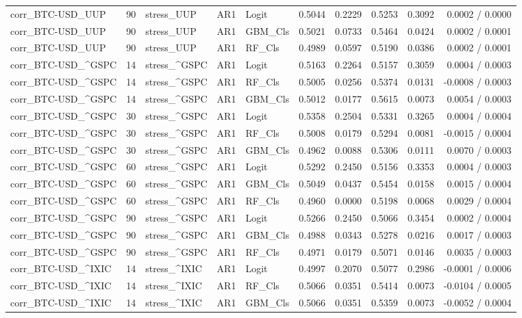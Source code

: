 \begin{table}[H]
\begin{tabular}{lllllrrrrr}
corr_BTC-USD_UUP & 90 & stress_UUP & AR1 & Logit & 0.5044 & 0.2229 & 0.5253 & 0.3092 & 0.0002 / 0.0000 \\
corr_BTC-USD_UUP & 90 & stress_UUP & AR1 & GBM_Cls & 0.5021 & 0.0733 & 0.5464 & 0.0424 & 0.0002 / 0.0001 \\
corr_BTC-USD_UUP & 90 & stress_UUP & AR1 & RF_Cls & 0.4989 & 0.0597 & 0.5190 & 0.0386 & 0.0002 / 0.0001 \\
corr_BTC-USD_^GSPC & 14 & stress_^GSPC & AR1 & Logit & 0.5163 & 0.2264 & 0.5157 & 0.3059 & 0.0004 / 0.0003 \\
corr_BTC-USD_^GSPC & 14 & stress_^GSPC & AR1 & RF_Cls & 0.5005 & 0.0256 & 0.5374 & 0.0131 & -0.0008 / 0.0003 \\
corr_BTC-USD_^GSPC & 14 & stress_^GSPC & AR1 & GBM_Cls & 0.5012 & 0.0177 & 0.5615 & 0.0073 & 0.0054 / 0.0003 \\
corr_BTC-USD_^GSPC & 30 & stress_^GSPC & AR1 & Logit & 0.5358 & 0.2504 & 0.5331 & 0.3265 & 0.0004 / 0.0004 \\
corr_BTC-USD_^GSPC & 30 & stress_^GSPC & AR1 & RF_Cls & 0.5008 & 0.0179 & 0.5294 & 0.0081 & -0.0015 / 0.0004 \\
corr_BTC-USD_^GSPC & 30 & stress_^GSPC & AR1 & GBM_Cls & 0.4962 & 0.0088 & 0.5306 & 0.0111 & 0.0070 / 0.0003 \\
corr_BTC-USD_^GSPC & 60 & stress_^GSPC & AR1 & Logit & 0.5292 & 0.2450 & 0.5156 & 0.3353 & 0.0004 / 0.0003 \\
corr_BTC-USD_^GSPC & 60 & stress_^GSPC & AR1 & GBM_Cls & 0.5049 & 0.0437 & 0.5454 & 0.0158 & 0.0015 / 0.0004 \\
corr_BTC-USD_^GSPC & 60 & stress_^GSPC & AR1 & RF_Cls & 0.4960 & 0.0000 & 0.5198 & 0.0068 & 0.0029 / 0.0004 \\
corr_BTC-USD_^GSPC & 90 & stress_^GSPC & AR1 & Logit & 0.5266 & 0.2450 & 0.5066 & 0.3454 & 0.0002 / 0.0004 \\
corr_BTC-USD_^GSPC & 90 & stress_^GSPC & AR1 & GBM_Cls & 0.4988 & 0.0343 & 0.5278 & 0.0216 & 0.0017 / 0.0003 \\
corr_BTC-USD_^GSPC & 90 & stress_^GSPC & AR1 & RF_Cls & 0.4971 & 0.0179 & 0.5071 & 0.0146 & 0.0035 / 0.0003 \\
corr_BTC-USD_^IXIC & 14 & stress_^IXIC & AR1 & Logit & 0.4997 & 0.2070 & 0.5077 & 0.2986 & -0.0001 / 0.0006 \\
corr_BTC-USD_^IXIC & 14 & stress_^IXIC & AR1 & RF_Cls & 0.5066 & 0.0351 & 0.5414 & 0.0073 & -0.0104 / 0.0005 \\
corr_BTC-USD_^IXIC & 14 & stress_^IXIC & AR1 & GBM_Cls & 0.5066 & 0.0351 & 0.5359 & 0.0073 & -0.0052 / 0.0004 \\

\end{tabular}
\end{table}
